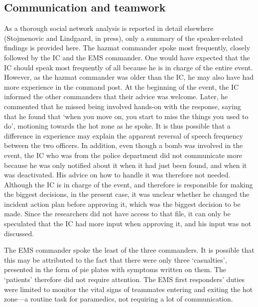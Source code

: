 \documentclass[link]{IWCOMP}
\begin{document}
\subsection{Communication and teamwork}\label{subsec4.5}

As a thorough social network analysis is reported in detail elsewhere
(Stojmenovic and Lindgaard, in press), only a summary of the speaker-related
findings is provided here. The hazmat commander spoke most frequently,
closely followed by the IC and the EMS commander. One would have expected
that the IC should speak most frequently of all because he is in charge of
the entire event. However, as the hazmat commander was older than the IC, he
may also have had more experience in the command post. At the beginning of
the event, the IC informed the other commanders that their advice was
welcome. Later, he commented that he missed being involved hands-on with the
response, saying that he found that `when you move on, you start to miss the
things you used to do', motioning towards the hot zone as he spoke. It is
thus possible that a difference in experience may explain the apparent
reversal of speech frequency between the two officers. In addition, even
though a bomb was involved in the event, the IC who was from the police
department did not communicate more because he was only notified about it
when it had just been found, and when it was deactivated. His advice on how
to handle it was therefore not needed. Although the IC is in charge of the
event, and therefore is responsible for making the biggest decisions, in the
present case, it was unclear whether he changed the incident action plan
before approving it, which was the biggest decision to be made. Since the
researchers did not have access to that file, it can only be speculated that
the IC had more input when approving it, and his input was not discussed.

The EMS commander spoke the least of the three commanders. It is possible
that this may be attributed to the fact that there were only three
`casualties', presented in the form of pie plates with symptoms written on
them. The `patients' therefore did not require attention. The EMS first
responders' duties were limited to monitor the vital signs of teammates
entering and exiting the hot zone---a routine task for paramedics, not
requiring a lot of communication.
\end{document}
